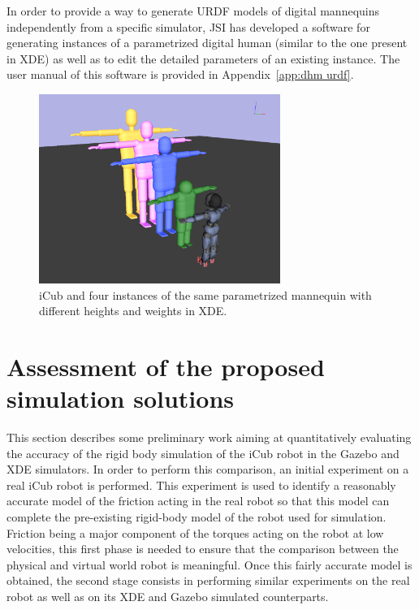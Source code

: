 \documentclass[12pt,a4paper,twoside]{article}
\begin{document}
In order to provide a way to generate URDF \cite{URDF} models of digital mannequins independently from a specific simulator, JSI has developed a software for generating instances of a parametrized digital human (similar to the one present in XDE) as well as to edit the detailed parameters of an existing instance. The user manual of this software is provided in Appendix~\ref{app:dhm urdf}.

\begin{figure}[h]
\begin{center}
\centering
\includegraphics[width=0.7\textwidth]{icub_with_colored_humans.png}
\caption{iCub and four instances of the same parametrized mannequin with different heights and weights in XDE.}
\label{fig:view-xde-dh}
\end{center}
\end{figure}


\section{Assessment of the proposed simulation solutions}
\label{sec:comparison}

This section describes some preliminary work aiming at quantitatively evaluating the accuracy of the rigid body simulation of the iCub robot in the Gazebo \cite{Gazebo} and XDE \cite{XDE} simulators. In order to perform this comparison, an initial experiment on a real iCub robot is performed. This experiment is used to identify a reasonably accurate model of the friction acting in the real robot so that this model can complete the pre-existing rigid-body model of the robot used for simulation. Friction being a major component of the torques acting on the robot at low velocities, this first phase is needed to ensure that the comparison between the physical and virtual world robot is meaningful. Once this fairly accurate model is obtained, the second stage consists in performing similar experiments on the real robot as well as on its XDE and Gazebo simulated counterparts.
\end{document}
